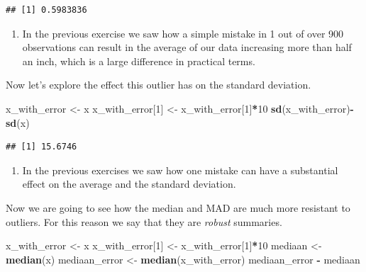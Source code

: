 \documentclass[
]{article}
\newenvironment{Shaded}{\begin{snugshade}}{\end{snugshade}}
\newcommand{\DecValTok}[1]{\textcolor[rgb]{0.00,0.00,0.81}{#1}}
\newcommand{\KeywordTok}[1]{\textcolor[rgb]{0.13,0.29,0.53}{\textbf{#1}}}
\newcommand{\NormalTok}[1]{#1}
\newcommand{\OperatorTok}[1]{\textcolor[rgb]{0.81,0.36,0.00}{\textbf{#1}}}
\newcommand{\StringTok}[1]{\textcolor[rgb]{0.31,0.60,0.02}{#1}}
\providecommand{\tightlist}{%
  \setlength{\itemsep}{0pt}\setlength{\parskip}{0pt}}
\begin{document}
\begin{verbatim}
## [1] 0.5983836
\end{verbatim}

\begin{enumerate}
\def\labelenumi{\arabic{enumi}.}
\setcounter{enumi}{3}
\tightlist
\item
  In the previous exercise we saw how a simple mistake in 1 out of over
  900 observations can result in the average of our data increasing more
  than half an inch, which is a large difference in practical terms.
\end{enumerate}

Now let's explore the effect this outlier has on the standard deviation.

\begin{Shaded}
\begin{Highlighting}[]
\NormalTok{x_with_error <-}\StringTok{ }\NormalTok{x}
\NormalTok{x_with_error[}\DecValTok{1}\NormalTok{] <-}\StringTok{ }\NormalTok{x_with_error[}\DecValTok{1}\NormalTok{]}\OperatorTok{*}\DecValTok{10}
\KeywordTok{sd}\NormalTok{(x_with_error)}\OperatorTok{-}\StringTok{ }\KeywordTok{sd}\NormalTok{(x)}
\end{Highlighting}
\end{Shaded}

\begin{verbatim}
## [1] 15.6746
\end{verbatim}

\begin{enumerate}
\def\labelenumi{\arabic{enumi}.}
\setcounter{enumi}{4}
\tightlist
\item
  In the previous exercises we saw how one mistake can have a
  substantial effect on the average and the standard deviation.
\end{enumerate}

Now we are going to see how the median and MAD are much more resistant
to outliers. For this reason we say that they are \emph{robust}
summaries.

\begin{Shaded}
\begin{Highlighting}[]
\NormalTok{x_with_error <-}\StringTok{ }\NormalTok{x}
\NormalTok{x_with_error[}\DecValTok{1}\NormalTok{] <-}\StringTok{ }\NormalTok{x_with_error[}\DecValTok{1}\NormalTok{]}\OperatorTok{*}\DecValTok{10}
\NormalTok{mediaan <-}\StringTok{ }\KeywordTok{median}\NormalTok{(x)}
\NormalTok{mediaan_error <-}\StringTok{ }\KeywordTok{median}\NormalTok{(x_with_error)}
\NormalTok{mediaan_error }\OperatorTok{-}\StringTok{ }\NormalTok{mediaan}
\end{Highlighting}
\end{Shaded}
\end{document}
